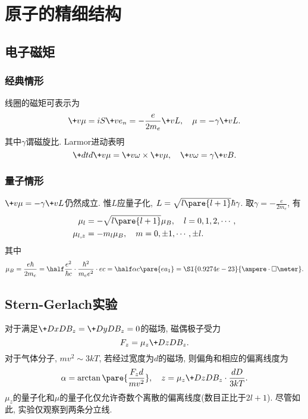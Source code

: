 \documentclass[hidelinks]{ctexart}
\begin{document}
\section{原子的精细结构} %
\label{sec:原子的精细结构}

\subsection{电子磁矩} %
\label{sub:电子磁矩}

\subsubsection{经典情形} %
\label{ssub:经典情形}

线圈的磁矩可表示为
\[ \+v\mu = iS\+ve_n = -\frac{e}{2m_e}\+vL,\quad \mu = -\gamma\+vL. \]
其中$\gamma$谓磁旋比. Larmor进动表明
\[ \+dtd{\+v\mu} = \+v\omega\times \+v\mu,\quad \+v\omega = \gamma \+vB. \]


\subsubsection{量子情形} %
\label{ssub:量子情形}

$\+v\mu = -\gamma\+vL$仍然成立. 惟$L$应量子化, $L = \sqrt{l\pare{l+1}}\hbar\gamma$. 取$\displaystyle \gamma = - \frac{e}{2m_e}$, 有
\begin{align*}
    \mu_l &= -\sqrt{l\pare{l+1}}\mu_B,\quad l = 0,1,2,\cdots,\\ \mu_{l,z} &= -m_l\mu_B,\quad m = 0,\pm 1,\cdots,\pm l.
\end{align*}
其中
\[ \mu_B = \frac{e\hbar}{2m_e} = \half \frac{e^2}{\hbar c}\cdot \frac{\hbar^2}{m_e e^2}\cdot ec = \half \alpha c\pare{e a_1} = \SI{0.9274e-23}{\ampere\cdot\square\meter}. \]



\subsection{Stern-Gerlach实验} %
\label{sub:stern_gerlach实验}

对于满足$\displaystyle \+DxD{B_z} = \+DyD{B_z} = 0$的磁场, 磁偶极子受力
\[ F_z = \mu_z \+DzD{B_z}. \]
对于气体分子, $mv^2 \sim 3kT$, 若经过宽度为$d$的磁场, 则偏角和相应的偏离线度为
\begin{equation}
    \label{eq:偏离线度}
    \alpha = \arctan\pare{\frac{F_zd}{mv^2}},\quad z = \mu_z \+DzD{B_z}\cdot \frac{dD}{3kT}. 
\end{equation}
$\mu_z$的量子化和$\mu$的量子化仅允许奇数个离散的偏离线度(数目正比于$2l+1$). 尽管如此, 实验仅观察到两条分立线.
\end{document}
